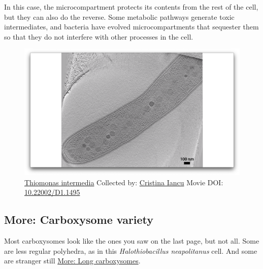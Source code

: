 \documentclass[]{tufte-book}
\begin{document}
In this case, the microcompartment protects its contents from the rest
of the cell, but they can also do the reverse. Some metabolic pathways
generate toxic intermediates, and bacteria have evolved
microcompartments that sequester them so that they do not interfere with
other processes in the cell.





\begin{figure}
\includegraphics{movie_stills/4_7} \caption[\protect\hyperlink{tree}{Thiomonas intermedia} Collected by:
\protect\hyperlink{cristina_iancu}{Cristina Iancu} Movie DOI:
\href{https://doi.org/10.22002/D1.1495}{10.22002/D1.1495}]{\protect\hyperlink{tree}{Thiomonas intermedia} Collected by:
\protect\hyperlink{cristina_iancu}{Cristina Iancu} Movie DOI:
\href{https://doi.org/10.22002/D1.1495}{10.22002/D1.1495}}\label{fig:4-7}
\end{figure}

\hypertarget{Carboxysome_variety}{\subsection*{More: Carboxysome
variety}\label{Carboxysome_variety}}

Most carboxysomes look like the ones you saw on the last page, but not
all. Some are less regular polyhedra, as in this \emph{Halothiobacillus
neapolitanus} cell. And some are stranger still
\protect\hyperlink{Long_carboxysomes}{More: Long carboxysomes}.
\end{document}
